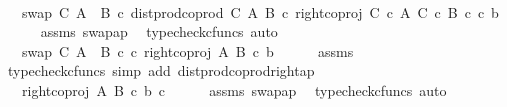 \begin{isabellebody}
\ \ \isamarkupfalse%
\ \isamarkupfalse%
\ {\isachardoublequoteopen}{\isachardot}{\kern0pt}{\isachardot}{\kern0pt}{\isachardot}{\kern0pt}\ {\isacharequal}{\kern0pt}\ swap\ C\ {\isacharparenleft}{\kern0pt}A\ {\isasymCoprod}\ B{\isacharparenright}{\kern0pt}\ {\isasymcirc}\isactrlsub c\ dist{\isacharunderscore}{\kern0pt}prod{\isacharunderscore}{\kern0pt}coprod\ C\ A\ B\ {\isasymcirc}\isactrlsub c\ right{\isacharunderscore}{\kern0pt}coproj\ {\isacharparenleft}{\kern0pt}C\ {\isasymtimes}\isactrlsub c\ A{\isacharparenright}{\kern0pt}\ {\isacharparenleft}{\kern0pt}C\ {\isasymtimes}\isactrlsub c\ B{\isacharparenright}{\kern0pt}\ {\isasymcirc}\isactrlsub c\ {\isasymlangle}c{\isacharcomma}{\kern0pt}\ b{\isasymrangle}{\isachardoublequoteclose}\isanewline
\ \ \ \ \isamarkupfalse%
\ assms\ swap{\isacharunderscore}{\kern0pt}ap\ \isamarkupfalse%
\ {\isacharparenleft}{\kern0pt}typecheck{\isacharunderscore}{\kern0pt}cfuncs{\isacharcomma}{\kern0pt}\ auto{\isacharparenright}{\kern0pt}\isanewline
\ \ \isamarkupfalse%
\ \isamarkupfalse%
\ {\isachardoublequoteopen}{\isachardot}{\kern0pt}{\isachardot}{\kern0pt}{\isachardot}{\kern0pt}\ {\isacharequal}{\kern0pt}\ swap\ C\ {\isacharparenleft}{\kern0pt}A\ {\isasymCoprod}\ B{\isacharparenright}{\kern0pt}\ {\isasymcirc}\isactrlsub c\ {\isasymlangle}c{\isacharcomma}{\kern0pt}\ right{\isacharunderscore}{\kern0pt}coproj\ A\ B\ {\isasymcirc}\isactrlsub c\ b{\isasymrangle}{\isachardoublequoteclose}\isanewline
\ \ \ \ \isamarkupfalse%
\ assms\ \isamarkupfalse%
\ {\isacharparenleft}{\kern0pt}typecheck{\isacharunderscore}{\kern0pt}cfuncs{\isacharcomma}{\kern0pt}\ simp\ add{\isacharcolon}{\kern0pt}\ dist{\isacharunderscore}{\kern0pt}prod{\isacharunderscore}{\kern0pt}coprod{\isacharunderscore}{\kern0pt}right{\isacharunderscore}{\kern0pt}ap{\isacharparenright}{\kern0pt}\isanewline
\ \ \isamarkupfalse%
\ \isamarkupfalse%
\ {\isachardoublequoteopen}{\isachardot}{\kern0pt}{\isachardot}{\kern0pt}{\isachardot}{\kern0pt}\ {\isacharequal}{\kern0pt}\ {\isasymlangle}right{\isacharunderscore}{\kern0pt}coproj\ A\ B\ {\isasymcirc}\isactrlsub c\ b{\isacharcomma}{\kern0pt}\ c{\isasymrangle}{\isachardoublequoteclose}\isanewline
\ \ \ \ \isamarkupfalse%
\ assms\ swap{\isacharunderscore}{\kern0pt}ap\ \isamarkupfalse%
\ {\isacharparenleft}{\kern0pt}typecheck{\isacharunderscore}{\kern0pt}cfuncs{\isacharcomma}{\kern0pt}\ auto{\isacharparenright}{\kern0pt}\isanewline

\end{isabellebody}
